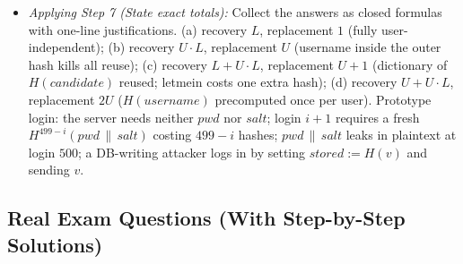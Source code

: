 \documentclass[12pt, a4paper]{article}
\begin{document}
\begin{itemize}
\[
499 - i \text{ hash evaluations.}
\]

Part (iii): at login $i = 500$ the client sends $H^{0}(pwd \,\|\, salt)$, and by definition $H^{0}(x) = x$, so the wire literally carries $pwd \,\|\, salt$ in plaintext.
    An eavesdropper therefore learns the password at the 500th login (and at no earlier login, because all earlier tokens are digests and $H$ is one-way).
    Part (iv): Trudy picks ANY value $v$ of her choice, overwrites $stored := H(v)$, and sends $v$ as her login token.

    The server computes $H(v)$, finds it equal to $stored$, accepts, and updates $stored := v$. She never needed $pwd$, $salt$, or $i$ -- the server-side check only compares one hash, so whoever controls $stored$ controls login.
    \item \textit{Applying Step 7 (State exact totals):} Collect the answers as closed formulas with one-line justifications. (a) recovery $L$, replacement $1$ (fully user-independent); (b) recovery $U \cdot L$, replacement $U$ (username inside the outer hash kills all reuse);
    (c) recovery $L + U \cdot L$, replacement $U + 1$ (dictionary of $H(candidate)$ reused; letmein costs one extra hash); (d) recovery $U + U \cdot L$, replacement $2U$ ($H(username)$ precomputed once per user).
    Prototype login: the server needs neither $pwd$ nor $salt$; login $i+1$ requires a fresh $H^{499-i}(pwd \,\|\, salt)$ costing $499 - i$ hashes; $pwd \,\|\, salt$ leaks in plaintext at login $500$; a DB-writing attacker logs in by setting $stored := H(v)$ and sending $v$.
\end{itemize}

\subsection*{Real Exam Questions (With Step-by-Step Solutions)}
\end{document}
